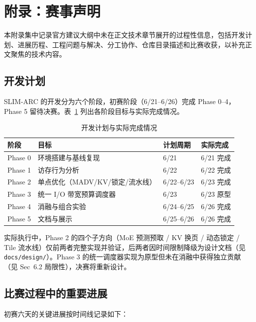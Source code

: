 \newpage
\section{附录：赛事声明}

本附录集中记录官方建议大纲中未在正文技术章节展开的过程性信息，包括开发计划、进展历程、工程问题与解决、分工协作、仓库目录描述和比赛收获，以补充正文聚焦的技术内容。

\subsection{开发计划}

SLIM-ARC 的开发分为六个阶段，初赛阶段（6/21--6/26）完成 Phase 0--4，Phase 5 留待决赛。表~\ref{tab:dev_plan} 列出各阶段目标与实际完成情况。

\begin{table}[H]
    \centering
    \caption{开发计划与实际完成情况}
    \label{tab:dev_plan}
    \begin{tabular}{llll}
        \toprule
        \textbf{阶段} & \textbf{目标} & \textbf{计划周期} & \textbf{实际完成} \\
        \midrule
        Phase 0 & 环境搭建与基线复现 & 6/21 & 6/21 完成 \\
        Phase 1 & 访存行为分析 & 6/22 & 6/22 完成 \\
        Phase 2 & 单点优化（MADV/KV/锁定/流水线） & 6/22--6/23 & 6/23 完成 \\
        Phase 3 & 统一 I/O 带宽预算调度器 & 6/23 & 6/23 原型 \\
        Phase 4 & 消融与组合实验 & 6/24--6/25 & 6/26 完成 \\
        Phase 5 & 文档与展示 & 6/25--6/26 & 6/26 完成 \\
        \bottomrule
    \end{tabular}
\end{table}

实际执行中，Phase 2 的四个子方向（MoE 预测预取 / KV 换页 / 动态锁定 / Tile 流水线）仅前两者完整实现并验证，后两者因时间限制降级为设计文档（见 \texttt{docs/design/}）。Phase 3 的统一调度器实现为原型但未在消融中获得独立贡献（见 Sec~6.2 局限性），决赛将重新设计。

\subsection{比赛过程中的重要进展}

初赛六天的关键进展按时间线记录如下：

